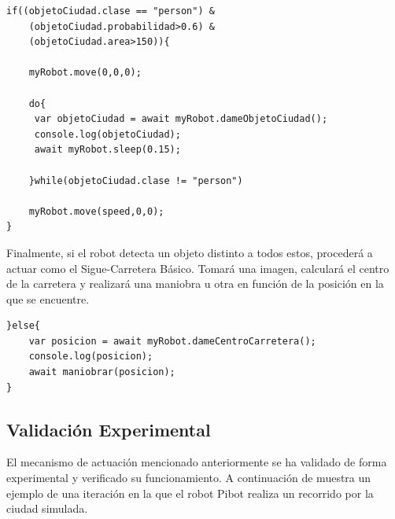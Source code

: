 \documentclass{report}
\begin{document}
\begin{lstlisting}[backgroundcolor = \color{light-gray},
				   aboveskip = 2em,
				   belowskip = 2em,
                   xleftmargin = 2cm,
                   framexleftmargin = 1em,
                   basicstyle=\small]
if((objetoCiudad.clase == "person") &
	(objetoCiudad.probabilidad>0.6) &
	(objetoCiudad.area>150)){
	
	myRobot.move(0,0,0);

	do{
	 var objetoCiudad = await myRobot.dameObjetoCiudad();
	 console.log(objetoCiudad);
	 await myRobot.sleep(0.15);

	}while(objetoCiudad.clase != "person")

	myRobot.move(speed,0,0);
}
\end{lstlisting}

Finalmente, si el robot detecta un objeto distinto a todos estos, procederá a actuar como el Sigue-Carretera Básico. Tomará una imagen, calculará el centro de la carretera y realizará una maniobra u otra en función de la posición en la que se encuentre.

\begin{lstlisting}[backgroundcolor = \color{light-gray},
				   aboveskip = 2em,
				   belowskip = 2em,
                   xleftmargin = 2cm,
                   framexleftmargin = 1em,
                   basicstyle=\small]
}else{
	var posicion = await myRobot.dameCentroCarretera();
	console.log(posicion);
	await maniobrar(posicion);
}
\end{lstlisting}


\subsection{Validación Experimental}
El mecanismo de actuación mencionado anteriormente se ha validado de forma experimental y verificado su funcionamiento. A continuación de muestra un ejemplo de una iteración en la que el robot Pibot realiza un recorrido por la ciudad simulada.
\end{document}
